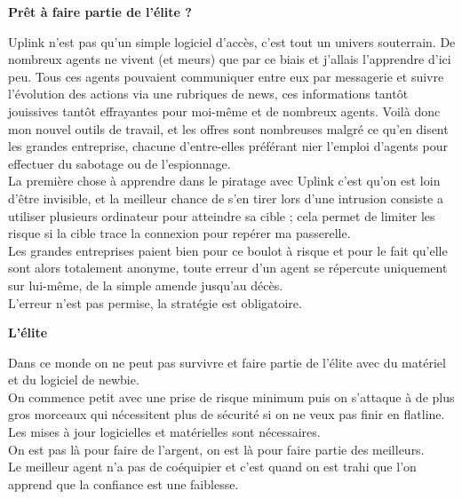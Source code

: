 \documentclass[11pt,twoside,a4paper]{book}
\begin{document}
\begin{multicols*}{2}
\vfill
\columnbreak

\begin{center}
	\textbf{\Large Pr{\^e}t {\`a} faire partie de l'{\'e}lite ?}
\end{center}

Uplink n'est pas qu'un simple logiciel d'acc{\`e}s, c'est tout un univers souterrain. De nombreux agents ne vivent (et meurs) que par ce biais et j'allais l'apprendre d'ici peu. Tous ces agents pouvaient communiquer entre eux par messagerie et suivre l'{\'e}volution des actions via une rubriques de news, ces informations tant{\^o}t jouissives tant{\^o}t effrayantes pour moi-m{\^e}me et de nombreux agents. Voil{\`a} donc mon nouvel outils de travail, et les offres sont nombreuses malgr{\'e} ce qu'en disent les grandes entreprise, chacune d'entre-elles pr{\'e}f{\'e}rant nier l'emploi d'agents pour effectuer du sabotage ou de l'espionnage.~\\
La premi{\`e}re chose {\`a} apprendre dans le piratage avec Uplink c'est qu'on est loin d'{\^e}tre invisible, et la meilleur chance de s'en tirer lors d'une intrusion consiste a utiliser plusieurs ordinateur pour atteindre sa cible ; cela permet de limiter les risque si la cible trace la connexion pour rep{\'e}rer ma passerelle. ~\\
Les grandes entreprises paient bien pour ce boulot {\`a} risque et pour le fait qu'elle sont alors totalement anonyme, toute erreur d'un agent se r{\'e}percute uniquement sur lui-m{\^e}me, de la simple amende jusqu'au d{\'e}c{\`e}s.~\\
L'erreur n'est pas permise, la strat{\'e}gie est obligatoire.~\\

\begin{center}
	\textbf{\Large L'{\'e}lite}
\end{center}

Dans ce monde on ne peut pas survivre et faire partie de l'{\'e}lite avec du mat{\'e}riel et du logiciel de newbie.~\\
On commence petit avec une prise de risque minimum puis on s'attaque {\`a} de plus gros morceaux qui n{\'e}cessitent plus de s{\'e}curit{\'e} si on ne veux pas finir en flatline.~\\
Les mises {\`a} jour logicielles et mat{\'e}rielles sont n{\'e}cessaires.~\\
On est pas l{\`a} pour faire de l'argent, on est l{\`a} pour faire partie des meilleurs.~\\
Le meilleur agent n'a pas de co{\'e}quipier et c'est quand on est trahi que l'on apprend que la confiance est une faiblesse.~\\


\end{multicols*}
\end{document}
